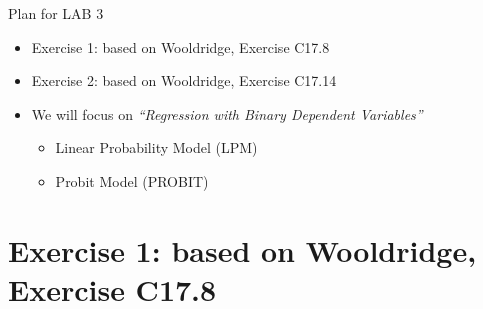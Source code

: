 \documentclass[
  10pt,
  ignorenonframetext,
]{beamer}
\providecommand{\tightlist}{%
  \setlength{\itemsep}{0pt}\setlength{\parskip}{0pt}}
\begin{document}
\begin{frame}{Plan for LAB 3}
\protect\hypertarget{plan-for-lab-3}{}
\begin{itemize}
\tightlist
\item
  Exercise 1: based on Wooldridge, Exercise C17.8
\item
  Exercise 2: based on Wooldridge, Exercise C17.14
\end{itemize}

\vspace{3mm}

\begin{itemize}
\tightlist
\item
  We will focus on \emph{``Regression with Binary Dependent Variables''}

  \begin{itemize}
  \tightlist
  \item
    Linear Probability Model (LPM)
  \item
    Probit Model (PROBIT)
  \end{itemize}
\end{itemize}
\end{frame}

\hypertarget{exercise-1-based-on-wooldridge-exercise-c17.8}{%
\section{Exercise 1: based on Wooldridge, Exercise
C17.8}\label{exercise-1-based-on-wooldridge-exercise-c17.8}}
\end{document}
